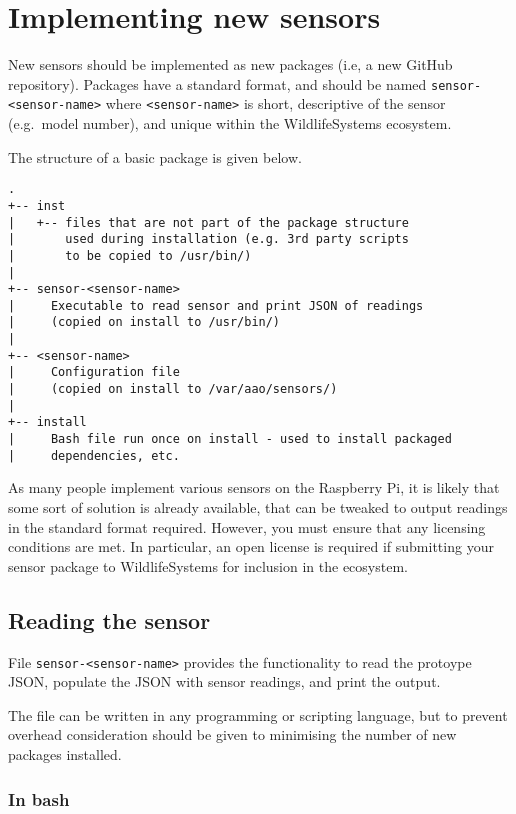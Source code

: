 \documentclass[
]{book}
\begin{document}
\hypertarget{implementing-new-sensors}{%
\chapter{Implementing new sensors}\label{implementing-new-sensors}}

New sensors should be implemented as new packages (i.e, a new GitHub repository). Packages have a standard format, and should be named \texttt{sensor-\textless{}sensor-name\textgreater{}} where \texttt{\textless{}sensor-name\textgreater{}} is short, descriptive of the sensor (e.g.~model number), and unique within the WildlifeSystems ecosystem.

The structure of a basic package is given below.

\begin{verbatim}
.
+-- inst
|   +-- files that are not part of the package structure
|       used during installation (e.g. 3rd party scripts 
|       to be copied to /usr/bin/)
|
+-- sensor-<sensor-name>
|     Executable to read sensor and print JSON of readings
|     (copied on install to /usr/bin/)
|
+-- <sensor-name>
|     Configuration file 
|     (copied on install to /var/aao/sensors/)
|
+-- install
|     Bash file run once on install - used to install packaged
|     dependencies, etc.
\end{verbatim}

As many people implement various sensors on the Raspberry Pi, it is likely that some sort of solution is already available, that can be tweaked to output readings in the standard format required. However, you must ensure that any licensing conditions are met. In particular, an open license is required if submitting your sensor package to WildlifeSystems for inclusion in the ecosystem.

\hypertarget{reading-the-sensor}{%
\section{Reading the sensor}\label{reading-the-sensor}}

File \texttt{sensor-\textless{}sensor-name\textgreater{}} provides the functionality to read the protoype JSON, populate the JSON with sensor readings, and print the output.

The file can be written in any programming or scripting language, but to prevent overhead consideration should be given to minimising the number of new packages installed.

\hypertarget{in-bash}{%
\subsection{In bash}\label{in-bash}}
\end{document}
